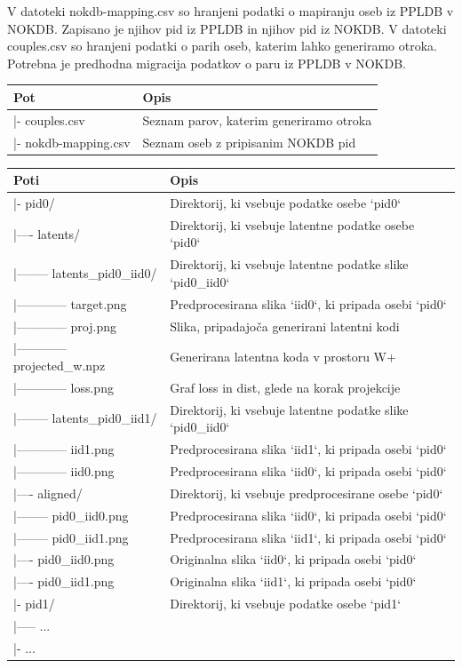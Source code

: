 \documentclass[a4paper,12pt,openright]{book}
\begin{document}
V datoteki nokdb-mapping.csv so hranjeni podatki o mapiranju oseb iz PPLDB v NOKDB. Zapisano je njihov pid iz PPLDB in njihov pid iz NOKDB. V datoteki couples.csv so hranjeni podatki o parih oseb, katerim lahko generiramo otroka. Potrebna je predhodna migracija podatkov o paru iz PPLDB v NOKDB.

\begin{center}
  \begin{tabular}{|l|l|}
  \hline
  Pot & Opis \\
  \hline
  |- couples.csv & Seznam parov, katerim generiramo otroka \\
  |- nokdb-mapping.csv & Seznam oseb z pripisanim NOKDB pid \\
  \hline
  \end{tabular}
\end{center}

\begin{center}
  \begin{tabular}{|l|l|}
  \hline
  Poti & Opis \\
  \hline
  |- pid0/ & Direktorij, ki vsebuje podatke osebe `pid0` \\
  |---- latents/ & Direktorij, ki vsebuje latentne podatke osebe `pid0` \\
  |-------- latents\_pid0\_iid0/ & Direktorij, ki vsebuje latentne podatke slike `pid0\_iid0` \\
  |------------ target.png & Predprocesirana slika `iid0`, ki pripada osebi `pid0` \\
  |------------ proj.png & Slika, pripadajoča generirani latentni kodi \\
  |------------ projected\_w.npz & Generirana latentna koda v prostoru W+ \\
  |------------ loss.png & Graf loss in dist, glede na korak projekcije \\
  |-------- latents\_pid0\_iid1/ & Direktorij, ki vsebuje latentne podatke slike `pid0\_iid0` \\
  |------------ iid1.png & Predprocesirana slika `iid1`, ki pripada osebi `pid0`\\
  |------------ iid0.png & Predprocesirana slika `iid0`, ki pripada osebi `pid0` \\
  |---- aligned/ & Direktorij, ki vsebuje predprocesirane osebe `pid0` \\
  |-------- pid0\_iid0.png & Predprocesirana slika `iid0`, ki pripada osebi `pid0` \\
  |-------- pid0\_iid1.png & Predprocesirana slika `iid1`, ki pripada osebi `pid0`\\
  |---- pid0\_iid0.png & Originalna slika `iid0`, ki pripada osebi `pid0`\\
  |---- pid0\_iid1.png & Originalna slika `iid1`, ki pripada osebi `pid0`\\
  |- pid1/ & Direktorij, ki vsebuje podatke osebe `pid1`\\
  |----- ... & \\
  |- ... & \\
  \hline
  \end{tabular}
\end{center}
\end{document}

